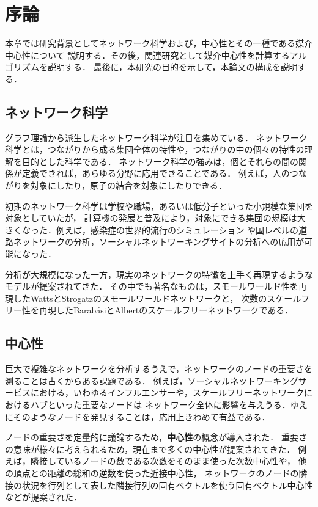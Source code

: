 \chapter{序論}
\label{chap:introduction}

本章では研究背景としてネットワーク科学および，中心性とその一種である媒介中心性について
説明する．その後，関連研究として媒介中心性を計算するアルゴリズムを説明する．
最後に，本研究の目的を示して，本論文の構成を説明する．

\section{ネットワーク科学}

グラフ理論から派生したネットワーク科学が注目を集めている．
ネットワーク科学とは，つながりから成る集団全体の特性や，つながりの中の個々の特性の理解を目的とした科学である．
ネットワーク科学の強みは，個とそれらの間の関係が定義できれば，あらゆる分野に応用できることである．
例えば，人のつながりを対象にしたり，原子の結合を対象にしたりできる．

初期のネットワーク科学は学校や職場，あるいは低分子といった小規模な集団を対象としていたが，
計算機の発展と普及により，対象にできる集団の規模は大きくなった．例えば，感染症の世界的流行のシミュレーション
や国レベルの道路ネットワークの分析，ソーシャルネットワーキングサイトの分析への応用が可能になった．

分析が大規模になった一方，現実のネットワークの特徴を上手く再現するようなモデルが提案されてきた．
その中でも著名なものは，スモールワールド性を再現したWattsとStrogatzのスモールワールドネットワーク\cite{Watts1998}と，
次数のスケールフリー性を再現したBarab{\'{a}}siとAlbertのスケールフリーネットワーク\cite{Barabasi1999}である．

\section{中心性}

巨大で複雑なネットワークを分析するうえで，ネットワークのノードの重要さを測ることは古くからある課題である．
例えば，ソーシャルネットワーキングサービスにおける，いわゆるインフルエンサーや，スケールフリーネットワークにおけるハブといった重要なノードは
ネットワーク全体に影響を与えうる．ゆえにそのようなノードを発見することは，応用上きわめて有益である．

ノードの重要さを定量的に議論するため，\textbf{中心性}の概念が導入された．
重要さの意味が様々に考えられるため，現在まで多くの中心性が提案されてきた．
例えば，隣接しているノードの数である次数をそのまま使った次数中心性や，
他の頂点との距離の総和の逆数を使った近接中心性\cite{Beauchamp1965}，
ネットワークのノードの隣接の状況を行列として表した隣接行列の固有ベクトルを使う固有ベクトル中心性
\cite{Bonacich1991}などが提案された．

